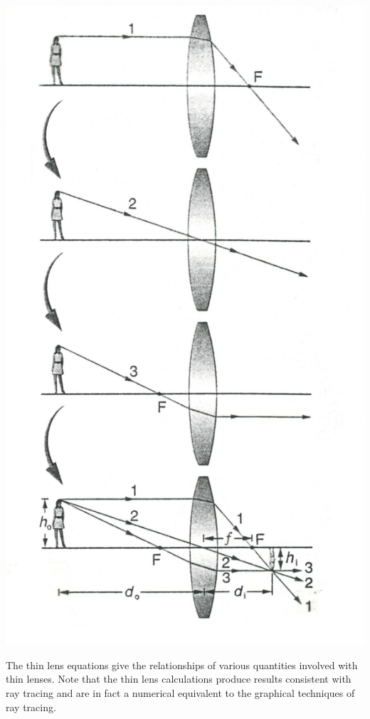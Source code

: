 \begin{multicols}{2}
\begin{center}
	\includegraphics[scale=0.7]{5bgraf/fig_17}
	\label{f:fig17}
\end{center}

The thin lens equations give the relationships of various quantities involved with thin lenses.  Note that the thin lens calculations produce results consistent with ray tracing and are in fact a numerical equivalent to the graphical techniques of ray tracing.


\end{multicols}
